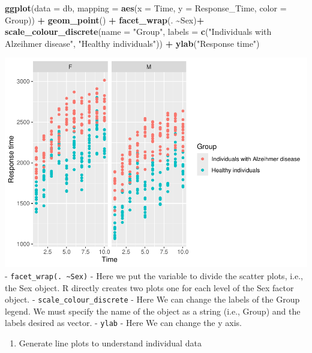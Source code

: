 \documentclass[
]{article}
\newenvironment{Shaded}{\begin{snugshade}}{\end{snugshade}}
\newcommand{\AttributeTok}[1]{\textcolor[rgb]{0.13,0.29,0.53}{#1}}
\newcommand{\FunctionTok}[1]{\textcolor[rgb]{0.13,0.29,0.53}{\textbf{#1}}}
\newcommand{\NormalTok}[1]{#1}
\newcommand{\SpecialCharTok}[1]{\textcolor[rgb]{0.81,0.36,0.00}{\textbf{#1}}}
\newcommand{\StringTok}[1]{\textcolor[rgb]{0.31,0.60,0.02}{#1}}
\providecommand{\tightlist}{%
  \setlength{\itemsep}{0pt}\setlength{\parskip}{0pt}}
\begin{document}
\begin{Shaded}
\begin{Highlighting}[]
\FunctionTok{ggplot}\NormalTok{(}\AttributeTok{data =}\NormalTok{ db, }
       \AttributeTok{mapping =} \FunctionTok{aes}\NormalTok{(}\AttributeTok{x =}\NormalTok{ Time, }\AttributeTok{y =}\NormalTok{ Response\_Time, }\AttributeTok{color =}\NormalTok{ Group)) }\SpecialCharTok{+} 
  \FunctionTok{geom\_point}\NormalTok{() }\SpecialCharTok{+}
  \FunctionTok{facet\_wrap}\NormalTok{(. }\SpecialCharTok{\textasciitilde{}}\NormalTok{Sex)}\SpecialCharTok{+}
       \FunctionTok{scale\_colour\_discrete}\NormalTok{(}\AttributeTok{name =} \StringTok{"Group"}\NormalTok{, }\AttributeTok{labels =} \FunctionTok{c}\NormalTok{(}\StringTok{"Individuals with Alzeihmer disease"}\NormalTok{, }\StringTok{"Healthy individuals"}\NormalTok{)) }\SpecialCharTok{+}
  \FunctionTok{ylab}\NormalTok{(}\StringTok{"Response time"}\NormalTok{)}
\end{Highlighting}
\end{Shaded}

\includegraphics{Simulated_example_files/figure-latex/unnamed-chunk-10-1.pdf}
- \texttt{facet\_wrap(.\ \textasciitilde{}Sex)} - Here we put the
variable to divide the scatter plots, i.e., the Sex object. R directly
creates two plots one for each level of the Sex factor object. -
\texttt{scale\_colour\_discrete} - Here We can change the labels of the
Group legend. We must specify the name of the object as a string (i.e.,
Group) and the labels desired as vector. - \texttt{ylab} - Here We can
change the y axis.

\begin{enumerate}
\def\labelenumi{\alph{enumi}.}
\setcounter{enumi}{7}
\tightlist
\item
  Generate line plots to understand individual data
\end{enumerate}
\end{document}
